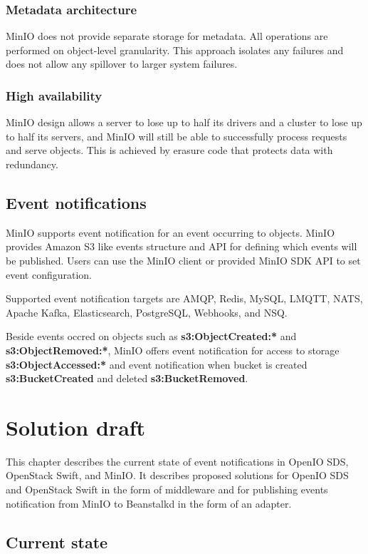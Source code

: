     \subsection*{Metadata architecture}
    MinIO does not provide separate storage for metadata. All operations are performed on object-level granularity. This approach isolates any failures and does not allow any spillover to larger system failures\cite{minioIntel}.

    \subsection*{High availability}
    MinIO design allows a server to lose up to half its drivers and a cluster to lose up to half its servers, and MinIO will still be able to successfully process requests and serve objects. This is achieved by erasure code that protects data with redundancy\cite{minioIntel}.

\section{Event notifications}
    MinIO supports event notification for an event occurring to objects. MinIO provides Amazon S3 like events structure and API for defining which events will be published. Users can use the MinIO client or provided MinIO SDK API to set event configuration.

    Supported event notification targets are AMQP, Redis, MySQL, LMQTT, NATS, Apache Kafka, Elasticsearch, PostgreSQL, Webhooks, and NSQ.

    Beside events occred on objects such as \textbf{s3:ObjectCreated:*} and \textbf{s3:ObjectRemoved:*}, MinIO offers event notification for access to storage \textbf{s3:ObjectAccessed:*} and event notification when bucket is created \textbf{s3:BucketCreated} and deleted \textbf{s3:BucketRemoved}.


\chapter{Solution draft}
    This chapter describes the current state of event notifications in OpenIO SDS, OpenStack Swift, and MinIO. It describes proposed solutions for OpenIO SDS and OpenStack Swift in the form of middleware and for publishing events notification from MinIO to Beanstalkd in the form of an adapter.
\section{Current state}

